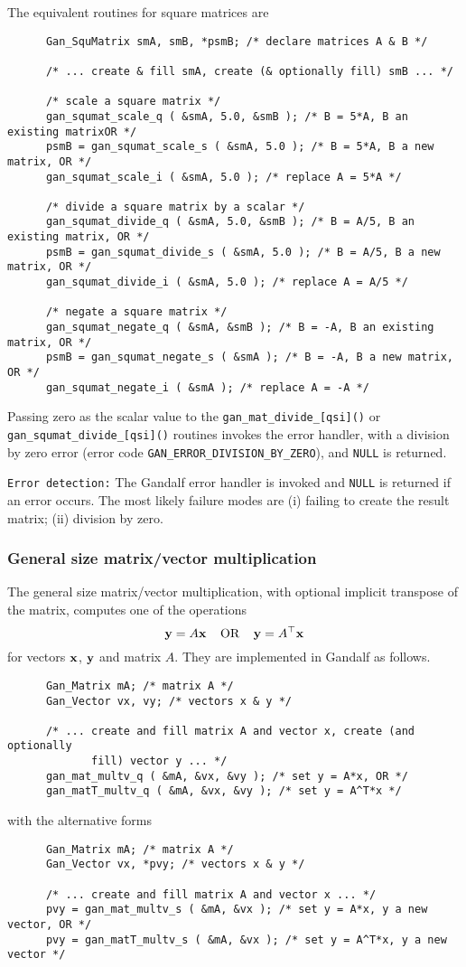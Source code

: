 The equivalent routines for square matrices are
\begin{verbatim}
      Gan_SquMatrix smA, smB, *psmB; /* declare matrices A & B */

      /* ... create & fill smA, create (& optionally fill) smB ... */

      /* scale a square matrix */
      gan_squmat_scale_q ( &smA, 5.0, &smB ); /* B = 5*A, B an existing matrixOR */
      psmB = gan_squmat_scale_s ( &smA, 5.0 ); /* B = 5*A, B a new matrix, OR */
      gan_squmat_scale_i ( &smA, 5.0 ); /* replace A = 5*A */

      /* divide a square matrix by a scalar */
      gan_squmat_divide_q ( &smA, 5.0, &smB ); /* B = A/5, B an existing matrix, OR */
      psmB = gan_squmat_divide_s ( &smA, 5.0 ); /* B = A/5, B a new matrix, OR */
      gan_squmat_divide_i ( &smA, 5.0 ); /* replace A = A/5 */

      /* negate a square matrix */
      gan_squmat_negate_q ( &smA, &smB ); /* B = -A, B an existing matrix, OR */
      psmB = gan_squmat_negate_s ( &smA ); /* B = -A, B a new matrix, OR */
      gan_squmat_negate_i ( &smA ); /* replace A = -A */
\end{verbatim}
Passing zero as the scalar value to the {\tt gan\_mat\_divide\_[qsi]()}
or {\tt gan\_squmat\_divide\_[qsi]()} routines invokes the error handler,
with a division by zero error
(error code {\tt GAN\_ERROR\_DIVISION\_BY\_ZERO}),
and {\tt NULL} is returned.

{\tt Error detection:} The Gandalf error handler is invoked and {\tt NULL}
is returned if an error occurs. The most likely failure modes are
(i) failing to create the result matrix; (ii) division by zero.

\subsubsection{General size matrix/vector multiplication}
The general size matrix/vector multiplication, with optional implicit
transpose of the matrix, computes one of the operations
\[ {\bf y} = A{\bf x}\;\;\;\;\mbox{OR} \;\;\;\;{\bf y} = A^{\top}{\bf x}
\]
for vectors ${\bf x}$, ${\bf y}$ and matrix $A$. They are implemented in Gandalf
as follows.
\begin{verbatim}
      Gan_Matrix mA; /* matrix A */
      Gan_Vector vx, vy; /* vectors x & y */

      /* ... create and fill matrix A and vector x, create (and optionally
             fill) vector y ... */
      gan_mat_multv_q ( &mA, &vx, &vy ); /* set y = A*x, OR */
      gan_matT_multv_q ( &mA, &vx, &vy ); /* set y = A^T*x */
\end{verbatim}
with the alternative forms
\begin{verbatim}
      Gan_Matrix mA; /* matrix A */
      Gan_Vector vx, *pvy; /* vectors x & y */

      /* ... create and fill matrix A and vector x ... */
      pvy = gan_mat_multv_s ( &mA, &vx ); /* set y = A*x, y a new vector, OR */
      pvy = gan_matT_multv_s ( &mA, &vx ); /* set y = A^T*x, y a new vector */
\end{verbatim}

